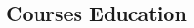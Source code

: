 \documentclass[10pt]{curriculum}
\begin{document}
\begin{paracol}{2}

\section{Courses Education} 





\begin{supertabular}{r l} %


\end{supertabular}
\end{paracol}
\end{document}
